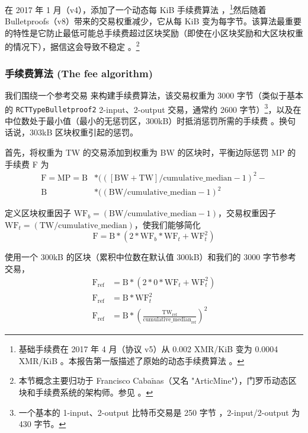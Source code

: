 在 2017 年 1 月（v4），添加了一个动态每 KiB 手续费算法 \cite{articmine-fee-video, articmine-36c3-dynamics, articmine-defcon27-video, jollymore-old-analysis}，\footnote{基础手续费在 2017 年 4 月（协议 v5）从 0.002 XMR/KiB 变为 0.0004 XMR/KiB \cite{monero-v5}。本报告第一版描述了原始的动态手续费算法 \cite{ztm-1}。}然后随着 Bulletproofs（v8）带来的交易权重减少，它从每 KiB 变为每字节。该算法最重要的特性是它防止最低可能总手续费超过区块奖励（即使在小区块奖励和大区块权重的情况下），据信这会导致不稳定 \cite{fee-reward-instability, no-reward-instability, selfish-miner}。\footnote{本节概念主要归功于 Francisco Caba$\tilde{\textrm{n}}$as（又名 "ArticMine"），门罗币动态区块和手续费系统的架构师。参见 \cite{articmine-fee-video, articmine-36c3-dynamics, articmine-defcon27-video}。}%


\subsubsection*{手续费算法 (The fee algorithm)}

我们围绕一个参考交易 \cite{jollymore-old-analysis}来构建手续费算法，该交易权重为 3000 字节（类似于基本的 {\tt RCTTypeBulletproof2} 2-input、2-output 交易，通常约 2600 字节）\footnote{一个基本的 1-input、2-output 比特币交易是 250 字节 \cite{bitcoin-txsizes-2015}，2-input/2-output 为 430 字节。}，以及在中位数处于最小值（最小的无惩罚区，300kB）时抵消惩罚所需的手续费 \cite{articmine-36c3-dynamics}。换句话说，303kB 区块权重引起的惩罚。%

首先，将权重为 TW 的交易添加到权重为 BW 的区块时，平衡边际惩罚 MP 的手续费 F 为\vspace{.175cm}
\begin{align*}
    \textrm{F} = \textrm{MP} = \textrm{B}&*(([\textrm{BW} + \textrm{TW}]/\textrm{cumulative\_median} - 1)^2 -\\ \textrm{B}&*((\textrm{BW}/\textrm{cumulative\_median} - 1)^2
\end{align*}{}

定义区块权重因子 $\textrm{WF}_b = (\textrm{BW}/\textrm{cumulative\_median} - 1)$，交易权重因子 $\textrm{WF}_t = (\textrm{TW}/\textrm{cumulative\_median})$，使我们能够简化\vspace{.175cm}
\[\textrm{F} = \textrm{B}*(2*\textrm{WF}_b*\textrm{WF}_t + \textrm{WF}_t^2)\]

使用一个 300kB 的区块（累积中位数在默认值 300kB）和我们的 3000 字节参考交易，
\begin{align*}
    \textrm{F}_{\textrm{ref}} &= \textrm{B}*(2*0*\textrm{WF}_t + \textrm{WF}_t^2)\\
    \textrm{F}_{\textrm{ref}} &= \textrm{B}*\textrm{WF}_t^2\\
    \textrm{F}_{\textrm{ref}} &= \textrm{B}*(\frac{\textrm{TW}_{\textrm{ref}}}{\textrm{cumulative\_median}_{\textrm{ref}}})^2
\end{align*}{}

